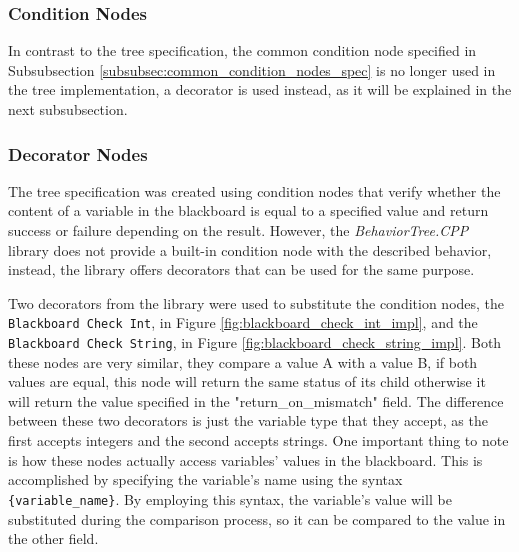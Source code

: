 \subsubsection{Condition Nodes}

In contrast to the tree specification, the common condition node specified in Subsubsection \ref{subsubsec:common_condition_nodes_spec} is no longer used in the tree implementation, a decorator is used instead, as it will be explained in the next subsubsection.

\subsubsection{Decorator Nodes}

The tree specification was created using condition nodes that verify whether the content of a variable in the blackboard is equal to a specified value and return success or failure depending on the result. However, the \textit{BehaviorTree.CPP} library does not provide a built-in condition node with the described behavior, instead, the library offers decorators that can be used for the same purpose.

Two decorators from the library were used to substitute the condition nodes, the \texttt{Blackboard Check Int}, in Figure \ref{fig:blackboard_check_int_impl}, and the \texttt{Blackboard Check String}, in Figure \ref{fig:blackboard_check_string_impl}. Both these nodes are very similar, they compare a value A with a value B, if both values are equal, this node will return the same status of its child otherwise it will return the value specified in the "return\_on\_mismatch" field. The difference between these two decorators is just the variable type that they accept, as the first accepts integers and the second accepts strings. One important thing to note is how these nodes actually access variables' values in the blackboard. This is accomplished by specifying the variable's name using the syntax \texttt{\{variable\_name\}}. By employing this syntax, the variable's value will be substituted during the comparison process, so it can be compared to the value in the other field.

